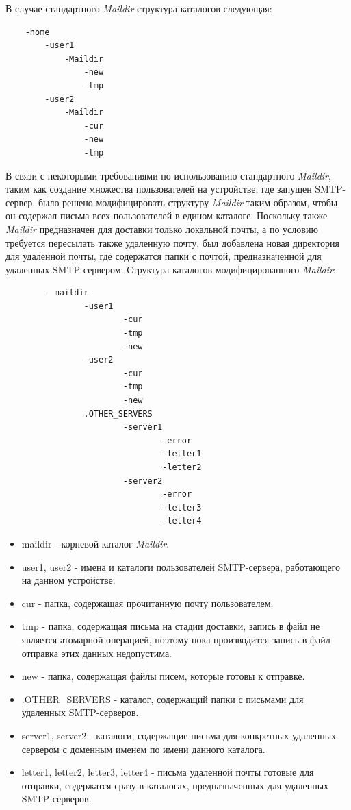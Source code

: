 \documentclass[a4paper,12pt]{report}
\begin{document}
	В случае стандартного \textit{Maildir} структура каталогов следующая:
	\begin{Verbatim}
	-home
		-user1
			-Maildir
				-new
				-tmp
		-user2
			-Maildir
				-cur
				-new
				-tmp

	\end{Verbatim}

	В связи с некоторыми требованиями по использованию стандартного \textit{Maildir}, 
	таким как создание множества пользователей на устройстве, где запущен SMTP-сервер, 
	было решено модифицировать структуру \textit{Maildir} таким образом, 
	чтобы он содержал письма всех пользователей в едином каталоге.
	 Поскольку также \textit{Maildir} предназначен для доставки только локальной почты,
	  а по условию требуется пересылать также удаленную почту,
	   был добавлена новая директория для удаленной почты, 
	   где содержатся папки с почтой, предназначенной для удаленных SMTP-сервером. 
	   Структура каталогов модифицированного \textit{Maildir}:
        
    	\begin{verbatim}
        - maildir
               	-user1
                       	-cur
                       	-tmp
                       	-new
               	-user2
                       	-cur
                       	-tmp
                       	-new
               	.OTHER_SERVERS
                       	-server1
                               	-error
                               	-letter1
                               	-letter2
                       	-server2
                               	-error
                               	-letter3
                               	-letter4
    	\end{verbatim}

	\begin{itemize}
		\item maildir - корневой каталог \textit{Maildir}.
		\item user1, user2 - имена и каталоги пользователей SMTP-сервера, работающего на данном устройстве.
		\item cur - папка, содержащая прочитанную почту пользователем.
		\item tmp - папка, содержащая письма на стадии доставки, запись в файл не является атомарной операцией, 
		поэтому пока производится запись в файл отправка этих данных недопустима.
		\item new - папка, содержащая файлы писем, которые готовы к отправке.
		\item .OTHER\_SERVERS - каталог, содержащий папки с письмами для удаленных SMTP-серверов.
		\item server1, server2 - каталоги, содержащие письма для конкретных удаленных 
		сервером с доменным именем по имени данного каталога.
		\item letter1, letter2, letter3, letter4 - письма удаленной почты готовые для отправки, 
		содержатся сразу в каталогах, предназначенных для удаленных SMTP-серверов.
	\end{itemize}
    
\end{document}
